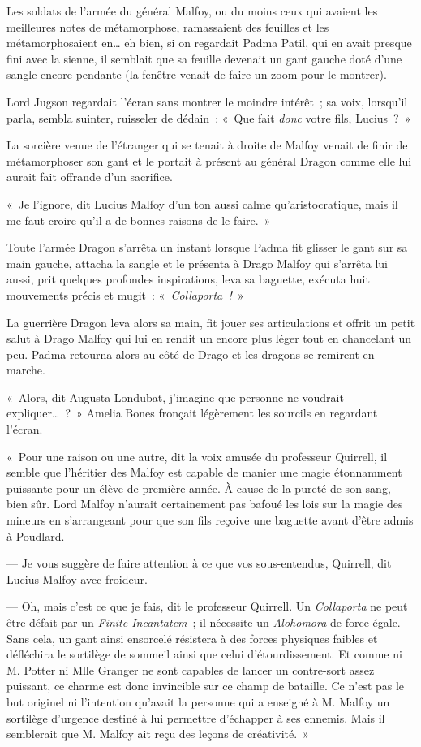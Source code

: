 Les soldats de l'armée du général Malfoy, ou du moins ceux qui avaient les meilleures notes de métamorphose, ramassaient des feuilles et les métamorphosaient en… eh bien, si on regardait Padma Patil, qui en avait presque fini avec la sienne, il semblait que sa feuille devenait un gant gauche doté d'une sangle encore pendante (la fenêtre venait de faire un zoom pour le montrer).

Lord Jugson regardait l'écran sans montrer le moindre intérêt~; sa voix, lorsqu'il parla, sembla suinter, ruisseler de dédain~: «~Que fait \emph{donc} votre fils, Lucius~?~»

La sorcière venue de l'étranger qui se tenait à droite de Malfoy venait de finir de métamorphoser son gant et le portait à présent au général Dragon comme elle lui aurait fait offrande d'un sacrifice.

«~Je l'ignore, dit Lucius Malfoy d'un ton aussi calme qu'aristocratique, mais il me faut croire qu'il a de bonnes raisons de le faire.~»

Toute l'armée Dragon s'arrêta un instant lorsque Padma fit glisser le gant sur sa main gauche, attacha la sangle et le présenta à Drago Malfoy qui s'arrêta lui aussi, prit quelques profondes inspirations, leva sa baguette, exécuta huit mouvements précis et mugit~: «~\emph{Collaporta~!}~»

La guerrière Dragon leva alors sa main, fit jouer ses articulations et offrit un petit salut à Drago Malfoy qui lui en rendit un encore plus léger tout en chancelant un peu. Padma retourna alors au côté de Drago et les dragons se remirent en marche.

«~Alors, dit Augusta Londubat, j'imagine que personne ne voudrait expliquer…~?~» Amelia Bones fronçait légèrement les sourcils en regardant l'écran.

«~Pour une raison ou une autre, dit la voix amusée du professeur Quirrell, il semble que l'héritier des Malfoy est capable de manier une magie étonnamment puissante pour un élève de première année. À cause de la pureté de son sang, bien sûr. Lord Malfoy n'aurait certainement pas bafoué les lois sur la magie des mineurs en s'arrangeant pour que son fils reçoive une baguette avant d'être admis à Poudlard.

--- Je vous suggère de faire attention à ce que vos sous-entendus, Quirrell, dit Lucius Malfoy avec froideur.

--- Oh, mais c'est ce que je fais, dit le professeur Quirrell. Un \emph{Collaporta} ne peut être défait par un \emph{Finite Incantatem}~; il nécessite un \emph{Alohomora} de force égale. Sans cela, un gant ainsi ensorcelé résistera à des forces physiques faibles et défléchira le sortilège de sommeil ainsi que celui d'étourdissement. Et comme ni M. Potter ni Mlle Granger ne sont capables de lancer un contre-sort assez puissant, ce charme est donc invincible sur ce champ de bataille. Ce n'est pas le but originel ni l'intention qu'avait la personne qui a enseigné à M. Malfoy un sortilège d'urgence destiné à lui permettre d'échapper à ses ennemis. Mais il semblerait que M. Malfoy ait reçu des leçons de créativité.~»

